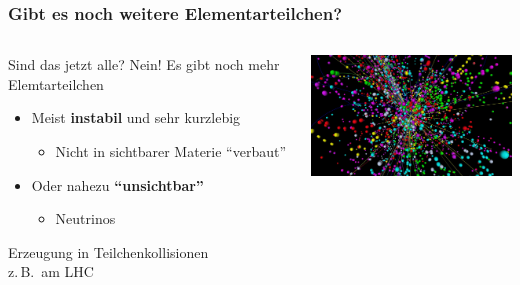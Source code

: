 \documentclass{beamer}
\newcommand{\zb}{z.\,B.\ }
\begin{document}
\begin{frame}
  \frametitle{Gibt es noch weitere Elementarteilchen?}
  \begin{columns}
    \begin{column}{0.65\textwidth}
      {\Large Sind das jetzt alle? Nein!}
      \vskip0.3cm
      Es gibt noch mehr Elemtarteilchen
      \begin{itemize}
      \item Meist \textbf{instabil} und sehr kurzlebig
        \begin{itemize}
        \item Nicht in sichtbarer Materie ``verbaut''
        \end{itemize}
      \item Oder nahezu \textbf{``unsichtbar''}
        \begin{itemize}
        \item Neutrinos
        \end{itemize}
      \end{itemize}
      \vskip0.5cm
      \begin{block}{}
        \centering
        \alert{\Large Erzeugung in Teilchenkollisionen\\ \zb am LHC}
      \end{block}
    \end{column}
    \begin{column}{0.35\textwidth}
      \centering
      \includegraphics[width=7cm,angle=90]{sm/CMS_Collision_gen-2007-004_02.jpg}
    \end{column}
  \end{columns}
\end{frame}
\end{document}
